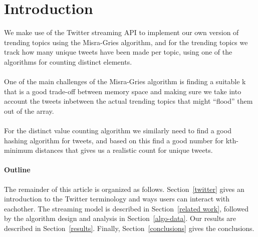 \section{Introduction}
\label{intro}
We make use of the Twitter streaming API to implement our own version of trending topics using the Misra-Gries algorithm, and for the trending topics we track how many unique tweets have been made per topic, using one of the algorithms for counting distinct elements. 
\\\\
One of the main challenges of the Misra-Gries algorithm is finding a suitable k that is a good trade-off between memory space and making sure we take into account the tweets inbetween the actual trending topics that might ``flood'' them out of the array.
\\\\
For the distinct value counting algorithm we similarly need to find a good hashing algorithm for tweets, and based on this find a good number for kth-minimum distances that gives us a realistic count for unique tweets.

\paragraph{Outline}
The remainder of this article is organized as follows.
Section~\ref{twitter} gives an introduction to the Twitter terminology and ways users can interact with eachother. The streaming model is described in Section~\ref{related work}, followed by the algorithm design and analysis in Section~\ref{algo-data}. Our results are described in Section~\ref{results}. Finally, Section~\ref{conclusions} gives the conclusions.